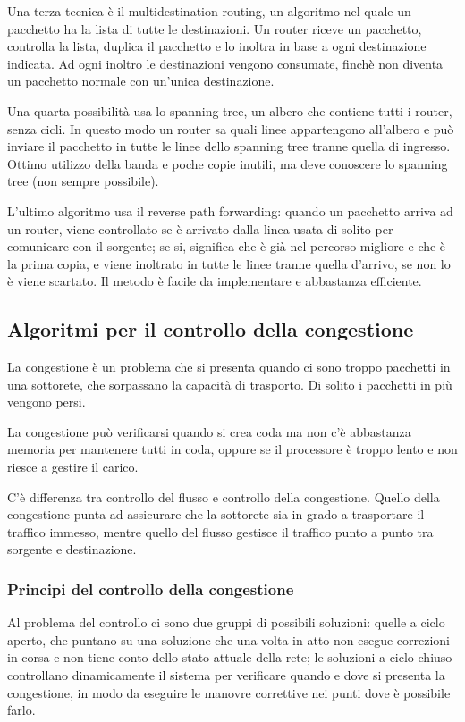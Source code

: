 Una terza tecnica è il multidestination routing, un algoritmo nel quale un pacchetto ha la lista di tutte le destinazioni.
Un router riceve un pacchetto, controlla la lista, duplica il pacchetto e lo inoltra in base a ogni destinazione indicata.
Ad ogni inoltro le destinazioni vengono consumate, finchè non diventa un pacchetto normale con un'unica destinazione.

Una quarta possibilità usa lo spanning tree, un albero che contiene tutti i router, senza cicli.
In questo modo un router sa quali linee appartengono all'albero e può inviare il pacchetto in tutte le linee dello spanning tree tranne quella di ingresso.
Ottimo utilizzo della banda e poche copie inutili, ma deve conoscere lo spanning tree (non sempre possibile).

L'ultimo algoritmo usa il reverse path forwarding:
quando un pacchetto arriva ad un router, viene controllato se è arrivato dalla linea usata di solito per comunicare con il sorgente;
se si, significa che è già nel percorso migliore e che è la prima copia, e viene inoltrato in tutte le linee tranne quella d'arrivo, se non lo è viene scartato.
Il metodo è facile da implementare e abbastanza efficiente.

\subsection{Algoritmi per il controllo della congestione} %
La congestione è un problema che si presenta quando ci sono troppo pacchetti in una sottorete, che sorpassano la capacità di trasporto.
Di solito i pacchetti in più vengono persi.

La congestione può verificarsi quando si crea coda ma non c'è abbastanza memoria per mantenere tutti in coda, oppure se il processore è troppo lento e non riesce a gestire il carico.

C'è differenza tra controllo del flusso e controllo della congestione.
Quello della congestione punta ad assicurare che la sottorete sia in grado a trasportare il traffico immesso, mentre quello del flusso gestisce il traffico punto a punto tra sorgente e destinazione.

\subsubsection{Principi del controllo della congestione}
Al problema del controllo ci sono due gruppi di possibili soluzioni:
quelle a ciclo aperto, che puntano su una soluzione che una volta in atto non esegue correzioni in corsa e non tiene conto dello stato attuale della rete;
le soluzioni a ciclo chiuso controllano dinamicamente il sistema per verificare quando e dove si presenta la congestione, in modo da eseguire le manovre correttive nei punti dove è possibile farlo.

